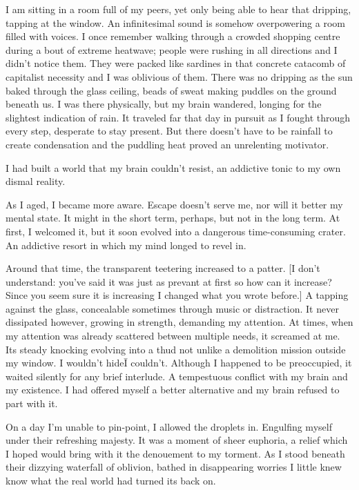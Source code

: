 I am sitting in a room full of my peers, yet only being able to hear
that dripping, tapping at the window. An infinitesimal sound is somehow
overpowering a room filled with voices. I once remember walking
through a crowded shopping centre during a bout of extreme heatwave;
people were rushing in all directions and I didn't notice them. They were packed like
sardines in that concrete catacomb of capitalist necessity and I was
oblivious of them. There was no dripping as the sun baked through the glass
ceiling, beads of sweat making puddles on the ground beneath us.
I was there physically, but my brain wandered, longing for the slightest
indication of rain. It traveled far that day in pursuit as I fought
through every step, desperate to stay present. But there doesn't have
to be rainfall to create condensation and the puddling heat proved an
unrelenting motivator.

I had built a world that my brain couldn't resist, an addictive tonic
to my own dismal reality.

As I aged, I became more aware. Escape doesn't serve me, nor will it
better my mental state. It might in the short term, perhaps, but not
in the long term. At first, I welcomed it, but it soon evolved into a
dangerous time-consuming crater. An addictive resort in which my mind
longed to revel in.

Around that time, the transparent teetering increased to a patter.
[I don't understand:  you've said it was just as prevant at first so how can it increase?
Since you seem sure it is increasing I changed what you wrote before.]
A tapping against the glass, concealable sometimes through music or
distraction. It never dissipated however, growing in strength,
demanding my attention. At times, when my attention was already
scattered between multiple needs, it screamed at me. Its steady
knocking evolving into a thud not unlike a demolition mission outside
my window. I wouldn't hide\=I couldn't. Although I happened to be
preoccupied, it waited silently for any brief interlude. A tempestuous
conflict with my brain and my existence. I had offered myself a
better alternative and my brain refused to part with it.

On a day I'm unable to pin-point, I allowed the droplets
in. Engulfing myself under their refreshing majesty. It was a moment
of sheer euphoria, a relief which I hoped would bring with it the
denouement to my torment.  As I stood beneath their dizzying waterfall
of oblivion, bathed in disappearing worries I little knew know what
the real world had turned its back on.

